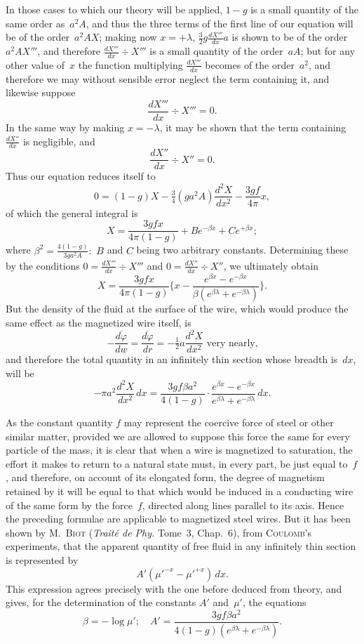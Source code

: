 \documentclass[11pt,notitlepage]{amsart}
\let\Person\textsc
\let\Title\textit
\renewcommand{\phi}{\varphi}
\begin{document}
In those cases to which our theory will be applied, $1-g$ is a small
quantity of the same order as~$a^2A$, and thus the three terms of the first line
of our equation will be of the order~$a^2AX$;
making now $x=+\lambda$, $\tfrac32g\frac{dX'''}{dx}a$
is shown to be of the order~$a^2AX'''$,
and therefore $\frac{dX'''}{dx}\div X'''$ is a small
quantity of the order~$aA$; but for any other value of~$x$ the function 
multiplying $\frac{dX'''}{dx}$ becomes of the order~$a^2$,
and therefore we may without sensible
error neglect the term containing it, and likewise suppose
\[
\frac{dX'''}{dx}\div X'''=0.
\]
In the same way by making $x=-\lambda$, it may be shown that the term 
containing $\frac{dX''}{dx}$ is negligible, and
\[
\frac{dX''}{dx}\div X''=0.
\]
Thus our equation reduces itself to
\[
0=(1-g)X-\tfrac34(ga^2A)\frac{d^2X}{dx^2}-\frac{3gf}{4\pi}x,
\]
of which the general integral is
\[
X=\frac{3gfx}{4\pi(1-g)}+Be^{-\beta x}+Ce^{+\beta x};
\]
where $\beta^2=\frac{4(1-g)}{3ga^2A}:$ $B$ and $C$ being
two arbitrary constants. Determining
these by the conditions $0=\frac{dX'''}{dx}\div X'''$
and $0=\frac{dX''}{dx}\div X''$, we ultimately obtain
\[
X=\frac{3gfx}{4\pi(1-g)}
\biggl\{
  x-\frac{e^{\beta x}-e^{-\beta x}}{\beta(e^{\beta\lambda}+e^{-\beta\lambda})}
\biggr\}.
\]
But the density of the fluid at the surface of the wire, which would produce
the same effect as the magnetized wire itself, is
\[
-\frac{\overline{d\phi}}{dw}
=\frac{\overline{d\phi}}{dr}
=-\tfrac12a\frac{d^2X}{dx^2}
\text{\ very nearly,}
\]
and therefore the total quantity in an infinitely thin section whose breadth
is~$dx$, will be
\[
-\pi a^2\frac{d^2X}{dx^2}\,dx=
\frac{3gf\beta a^2}{4(1-g)}\cdot
\frac{e^{\beta x}-e^{-\beta x}}{e^{\beta\lambda}+e^{-\beta\lambda}}\,dx.
\]

As the constant quantity $f$ may represent the coercive force of steel
or other similar matter, provided we are allowed to suppose this force the
same for every particle of the mass, it is clear that when a wire is magnetized
to saturation, the effort it makes to return to a natural state must, in every
part, be just equal to~$f$, and therefore, on account of its elongated form, the
degree of magnetism retained by it will be equal to that which would be
induced in a conducting wire of the same form by the force~$f$, directed along
lines parallel to its axis. Hence the preceding formulae are applicable to
magnetized steel wires. But it has been shown
by M.~\Person{Biot} (\Title{Trait\'e de Phy.}
Tome~3, Chap.~6), from \Person{Coulomb}'s experiments,
that the apparent quantity of
free fluid in any infinitely thin section is represented by
\[
A'(\mu'^{-x}-\mu'^{+x})\,dx.
\]
This expression agrees precisely with the one before deduced from theory,
and gives, for the determination of the constants $A'$ and~$\mu'$,
the equations
\[
\beta=-\log\mu';\quad
A'=\frac{3gf\beta a^2}{4(1-g)(e^{\beta\lambda}+e^{-\beta\lambda})}.
\]
\end{document}
